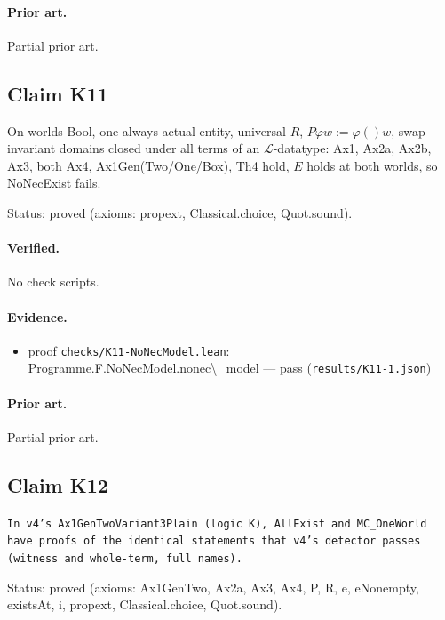 \documentclass{article}
\begin{document}
\paragraph{Prior art.} Partial prior art.

\subsection*{Claim K11}

On worlds Bool, one always-actual entity, universal $R$, $P\varphi w:=\varphi()w$, swap-invariant domains closed under all terms of an $\mathcal L$-datatype: Ax1, Ax2a, Ax2b, Ax3, both Ax4, Ax1Gen(Two/One/Box), Th4 hold, $E$ holds at both worlds, so NoNecExist fails.

Status: proved (axioms: propext, Classical.choice, Quot.sound).

\paragraph{Verified.}
No check scripts.

\paragraph{Evidence.}
\begin{itemize}
\item proof \texttt{checks/K11-NoNecModel.lean}: Programme.F.NoNecModel.nonec\textbackslash{}\_model --- pass (\texttt{results/K11-1.json})
\end{itemize}

\paragraph{Prior art.} Partial prior art.

\subsection*{Claim K12}

\texttt{In v4's Ax1GenTwoVariant3Plain (logic K), AllExist and MC\_OneWorld have proofs of the identical statements that v4's detector passes (witness and whole-term, full names).}

Status: proved (axioms: Ax1GenTwo, Ax2a, Ax3, Ax4, P, R, e, eNonempty, existsAt, i, propext, Classical.choice, Quot.sound).
\end{document}
